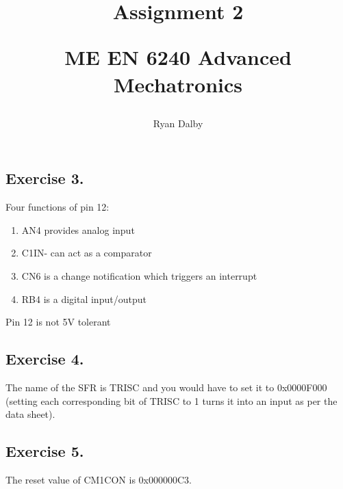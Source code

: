 \documentclass[12pt]{article}
\title{
    Assignment 2 

    \large{
        ME EN 6240 Advanced Mechatronics
    }  
}
\author{
        Ryan Dalby
}
\date{\displaydate{date}}
\begin{document}
\maketitle


\subsection*{Exercise 3.}
Four functions of pin 12:
\begin{enumerate}
    \item 
    AN4 provides analog input 

    \item 
    C1IN- can act as a comparator 

    \item 
    CN6 is a change notification which triggers an interrupt

    \item 
    RB4 is a digital input/output 

\end{enumerate}

Pin 12 is not 5V tolerant

\subsection*{Exercise 4.}
The name of the SFR is TRISC and you would have to set it to 0x0000F000 (setting each corresponding bit of TRISC to 1 turns it into an input as per the data sheet).

\subsection*{Exercise 5.}
The reset value of CM1CON is 0x000000C3.
\end{document}
